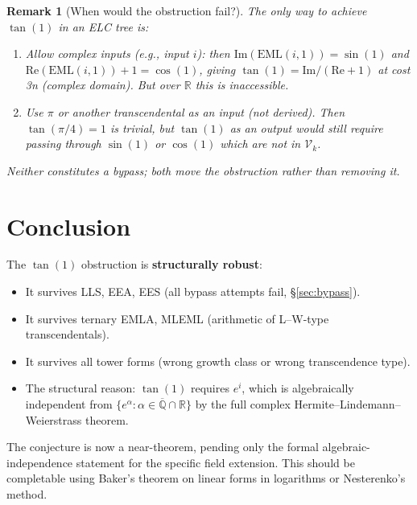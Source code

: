 \documentclass[11pt]{article}
\newtheorem{remark}[theorem]{Remark}
\begin{document}
\begin{remark}[When would the obstruction fail?]
The only way to achieve $\tan(1)$ in an ELC tree is:
\begin{enumerate}
  \item Allow \emph{complex} inputs (e.g., input $i$): then
        $\mathrm{Im}(\mathrm{EML}(i,1)) = \sin(1)$ and
        $\mathrm{Re}(\mathrm{EML}(i,1)) + 1 = \cos(1)$, giving
        $\tan(1) = \mathrm{Im}/(\mathrm{Re}+1)$ at cost 3n (complex domain).
        But over $\mathbb{R}$ this is inaccessible.
  \item Use $\pi$ or another transcendental as an \emph{input} (not derived).
        Then $\tan(\pi/4) = 1$ is trivial, but $\tan(1)$ as an output would still
        require passing through $\sin(1)$ or $\cos(1)$ which are not in $\mathcal{V}_k$.
\end{enumerate}
Neither constitutes a bypass; both move the obstruction rather than removing it.
\end{remark}

\section{Conclusion}
\label{sec:conclusion}

The $\tan(1)$ obstruction is \textbf{structurally robust}:
\begin{itemize}
  \item It survives LLS, EEA, EES (all bypass attempts fail, \S\ref{sec:bypass}).
  \item It survives ternary EMLA, MLEML (arithmetic of L--W-type transcendentals).
  \item It survives all tower forms (wrong growth class or wrong transcendence type).
  \item The structural reason: $\tan(1)$ requires $e^i$, which is algebraically
        independent from $\{e^\alpha : \alpha \in \overline{\mathbb{Q}} \cap \mathbb{R}\}$
        by the full complex Hermite--Lindemann--Weierstrass theorem.
\end{itemize}

The conjecture is now a near-theorem, pending only the formal algebraic-independence
statement for the specific field extension. This should be completable using
Baker's theorem on linear forms in logarithms or Nesterenko's method.
\end{document}
